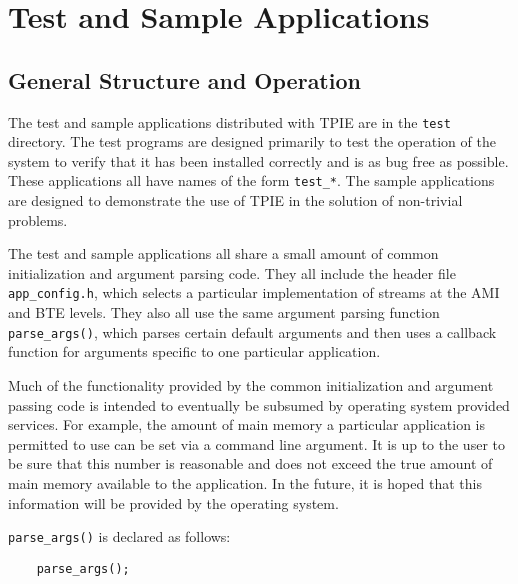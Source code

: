 \chapter{Test and Sample Applications}

\section{General Structure and Operation}

The test and sample applications distributed with TPIE are in the
\verb|test| directory.  The test programs are designed primarily to
test the operation of the system to verify that it has been installed
correctly and is as bug free as possible.  These applications all have
names of the form \verb|test_*|.  The sample applications are designed
to demonstrate the use of TPIE in the solution of non-trivial
problems.

The test and sample applications all share a small amount of common
initialization and argument parsing code.  They all include the header file
\verb|app_config.h|, which selects a particular implementation of streams
at the AMI and BTE levels. They also all use the same argument parsing
function \verb|parse_args()|, which parses certain default arguments and
then uses a callback function for arguments specific to one particular
application.

Much of the functionality provided by the common initialization and
argument passing code is intended to eventually be subsumed by
operating system provided services.  For example, the amount of main
memory a particular application is permitted to use can be set via a
command line argument.  It is up to the user to be sure that this
number is reasonable and does not exceed the true amount of main
memory available to the application.  In the future, it is hoped that
this information will be provided by the operating system.

\verb|parse_args()| is declared as follows:

\begin{verbatim}
    parse_args();
\end{verbatim}


